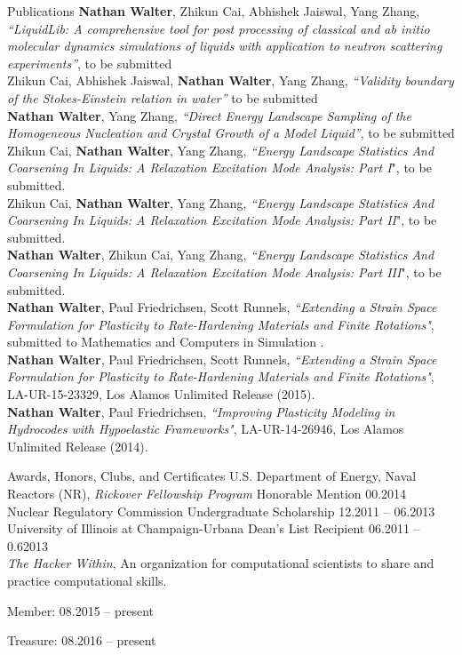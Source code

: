 \documentclass[9pt]{resume} %
\begin{document}
\begin{rSection}{Publications}
	{\bf Nathan Walter}, Zhikun Cai, Abhishek Jaiswal, Yang Zhang, {\it ``LiquidLib: A comprehensive tool for post processing of classical and \textit{ab initio} molecular dynamics simulations of liquids with application to neutron scattering experiments''}, to be submitted
	\\[5pt]
	Zhikun Cai, Abhishek Jaiswal, {\bf Nathan Walter}, Yang Zhang, {\it ``Validity boundary of the Stokes-Einstein relation in water''} to be submitted
	\\[5pt]
	{\bf Nathan Walter}, Yang Zhang, {\it ``Direct Energy Landscape Sampling of the Homogeneous Nucleation and Crystal Growth of a Model Liquid''}, to be submitted
	\\[5pt]
	Zhikun Cai, {\bf Nathan Walter}, Yang Zhang, {\it ``Energy Landscape Statistics And Coarsening In Liquids: A Relaxation Excitation Mode Analysis: Part I}", to be submitted.
	\\[5pt]
	Zhikun Cai, {\bf Nathan Walter}, Yang Zhang, {\it ``Energy Landscape Statistics And Coarsening In Liquids: A Relaxation Excitation Mode Analysis: Part II}", to be submitted.
	\\[5pt]
	{\bf Nathan Walter}, Zhikun Cai, Yang Zhang, {\it ``Energy Landscape Statistics And Coarsening In Liquids: A Relaxation Excitation Mode Analysis: Part III}", to be submitted.
	\\[5pt]
	{ \bf Nathan Walter}, Paul Friedrichsen, Scott Runnels, {\it{``Extending a Strain Space Formulation for Plasticity to Rate-Hardening Materials and Finite Rotations"}}, submitted to Mathematics and Computers in Simulation .
	\\[5pt]
	{ \bf Nathan Walter}, Paul Friedrichsen, Scott Runnels, {\it{``Extending a Strain Space Formulation for Plasticity to Rate-Hardening Materials and Finite Rotations"}}, LA-UR-15-23329, Los Alamos Unlimited Release (2015).
	\\[5pt]
	{ \bf Nathan Walter}, Paul Friedrichsen, {\it{``Improving Plasticity Modeling in Hydrocodes with Hypoelastic Frameworks"}}, LA-UR-14-26946, Los Alamos Unlimited Release (2014).
	\\	
\end{rSection}


\begin{rSection}{Awards, Honors, Clubs, and Certificates}
U.S. Department of Energy, Naval Reactors (NR), {\it Rickover Fellowship Program} Honorable Mention \hfill{00.2014} 
\\[3pt]
{ Nuclear Regulatory Commission Undergraduate Scholarship} \hfill{12.2011 -- 06.2013}
\\[3pt]
University of Illinois at Champaign-Urbana Dean's List Recipient \hfill{06.2011 -- 0.62013}
\\[3pt]
{\it{The Hacker Within}}, An organization for computational scientists to share and practice computational skills.\\
\strut\hfill {Member:   08.2015 -- present}\\
\strut\hfill Treasure: 08.2016 -- present
\end{rSection}
\end{document}
